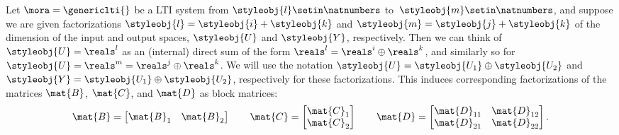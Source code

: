     Let $\mora = \genericlti{}$ be a LTI system from $\styleobj{l}\setin \natnumbers$ to~$\styleobj{m}\setin \natnumbers$, and suppose we are given factorizations $\styleobj{l} = \styleobj{i} + \styleobj{k}$ and $\styleobj{m} = \styleobj{j} + \styleobj{k}$ of the dimension of the input and output spaces, $\styleobj{U}$ and $\styleobj{Y}$, respectively.
    Then we can think of $\styleobj{U} = \reals^l$ as an (internal) direct sum of the form $\reals^l = \reals^i \oplus \reals^k$, and similarly so for $\styleobj{U} = \reals^m = \reals^j \oplus \reals^k$.
    We will use the notation $\styleobj{U} = \styleobj{U_1} \oplus \styleobj{U_2}$ and $\styleobj{Y} = \styleobj{U_1} \oplus \styleobj{U_2}$, respectively for these factorizations.
    This induces corresponding factorizations of the matrices $\mat{B}$, $\mat{C}$, and $\mat{D}$ as block matrices:
    \begin{equation}
        \mat{B} =
        \begin{bmatrix}
            \mat{B}_1 & \mat{B}_2
        \end{bmatrix}
        \qquad
        \mat{C} =
        \begin{bmatrix}
            \mat{C}_1 \\
            \mat{C}_2
        \end{bmatrix}
        \qquad
        \mat{D} =
        \begin{bmatrix}
            \mat{D}_{11} & \mat{D}_{12} \\
            \mat{D}_{21} & \mat{D}_{22}
        \end{bmatrix}.
    \end{equation}

